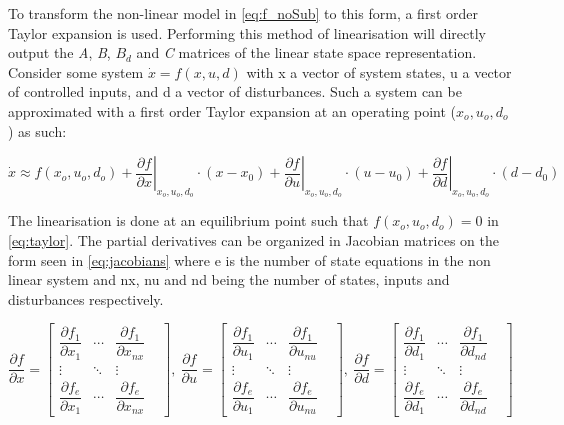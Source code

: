 To transform the non-linear model in \cref{eq:f_noSub} to this form, a first order Taylor expansion is used. Performing this method of linearisation will directly output the \textit{A}, \textit{B}, \textit{$B_d$} and \textit{C} matrices of the linear state space representation.\\

Consider some system $\dot{x} = f(x,u,d)$ with x a vector of system states, u a vector of controlled inputs, and d a vector of disturbances. Such a system can be approximated with a first order Taylor expansion at an operating point ($x_o, u_o, d_o$) as such:

\begin{equation} \label{eq:taylor}
	\dot{x}   \approx   f(x_o, u_o, d_o)   +
	\left. \dfrac{\partial f}{\partial x} \right |_{x_o, u_o, d_o} \cdot (x-x_0) +
	\left. \dfrac{\partial f}{\partial u} \right |_{x_o, u_o, d_o} \cdot (u-u_0) +
	\left. \dfrac{\partial f}{\partial d} \right |_{x_o, u_o, d_o} \cdot (d-d_0)
\end{equation}

The linearisation is done at an equilibrium point such that $f(x_o, u_o, d_o) = 0$ in \cref{eq:taylor}. The partial derivatives can be organized in Jacobian matrices on the form seen in \cref{eq:jacobians} where e is the number of state equations in the non linear system and nx, nu and nd being the number of states, inputs and disturbances respectively.

\begin{equation} \label{eq:jacobians}
	\dfrac{\partial f}{\partial x} =
		\begin{bmatrix}
			\dfrac{\partial f_1}{\partial x_1} & \cdots & \dfrac{\partial f_1}{\partial x_{nx}} & \\
			\vdots & \ddots & \vdots & \\
			\dfrac{\partial f_e}{\partial x_1} & \cdots & \dfrac{\partial f_e}{\partial x_{nx}} &
		\end{bmatrix}, \
	\dfrac{\partial f}{\partial u} =
		\begin{bmatrix}
			\dfrac{\partial f_1}{\partial u_1} & \cdots & \dfrac{\partial f_1}{\partial u_{nu}} & \\
			\vdots & \ddots & \vdots & \\
			\dfrac{\partial f_e}{\partial u_1} & \cdots & \dfrac{\partial f_e}{\partial u_{nu}} &
		\end{bmatrix}, \
	\dfrac{\partial f}{\partial d} =
		\begin{bmatrix}
			\dfrac{\partial f_1}{\partial d_1} & \cdots & \dfrac{\partial f_1}{\partial d_{nd}} & \\
			\vdots & \ddots & \vdots & \\
			\dfrac{\partial f_e}{\partial d_1} & \cdots & \dfrac{\partial f_e}{\partial d_{nd}} &
		\end{bmatrix}
\end{equation}

